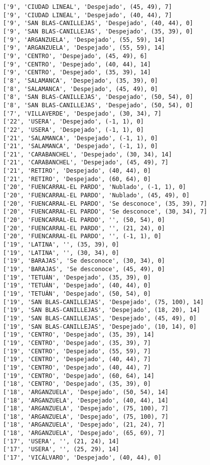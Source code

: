 \documentclass[11pt]{article}
\begin{document}
\begin{Verbatim}[commandchars=\\\{\}]
['9', 'CIUDAD LINEAL', 'Despejado', (45, 49), 7]
['9', 'CIUDAD LINEAL', 'Despejado', (40, 44), 7]
['9', 'SAN BLAS-CANILLEJAS', 'Despejado', (40, 44), 0]
['9', 'SAN BLAS-CANILLEJAS', 'Despejado', (35, 39), 0]
['9', 'ARGANZUELA', 'Despejado', (55, 59), 14]
['9', 'ARGANZUELA', 'Despejado', (55, 59), 14]
['9', 'CENTRO', 'Despejado', (45, 49), 6]
['9', 'CENTRO', 'Despejado', (40, 44), 14]
['9', 'CENTRO', 'Despejado', (35, 39), 14]
['8', 'SALAMANCA', 'Despejado', (35, 39), 0]
['8', 'SALAMANCA', 'Despejado', (45, 49), 0]
['8', 'SAN BLAS-CANILLEJAS', 'Despejado', (50, 54), 0]
['8', 'SAN BLAS-CANILLEJAS', 'Despejado', (50, 54), 0]
['7', 'VILLAVERDE', 'Despejado', (30, 34), 7]
['22', 'USERA', 'Despejado', (-1, 1), 0]
['22', 'USERA', 'Despejado', (-1, 1), 0]
['21', 'SALAMANCA', 'Despejado', (-1, 1), 0]
['21', 'SALAMANCA', 'Despejado', (-1, 1), 0]
['21', 'CARABANCHEL', 'Despejado', (30, 34), 14]
['21', 'CARABANCHEL', 'Despejado', (45, 49), 7]
['21', 'RETIRO', 'Despejado', (40, 44), 0]
['21', 'RETIRO', 'Despejado', (60, 64), 0]
['20', 'FUENCARRAL-EL PARDO', 'Nublado', (-1, 1), 0]
['20', 'FUENCARRAL-EL PARDO', 'Nublado', (45, 49), 0]
['20', 'FUENCARRAL-EL PARDO', 'Se desconoce', (35, 39), 7]
['20', 'FUENCARRAL-EL PARDO', 'Se desconoce', (30, 34), 7]
['20', 'FUENCARRAL-EL PARDO', '', (50, 54), 0]
['20', 'FUENCARRAL-EL PARDO', '', (21, 24), 0]
['20', 'FUENCARRAL-EL PARDO', '', (-1, 1), 0]
['19', 'LATINA', '', (35, 39), 0]
['19', 'LATINA', '', (30, 34), 0]
['19', 'BARAJAS', 'Se desconoce', (30, 34), 0]
['19', 'BARAJAS', 'Se desconoce', (45, 49), 0]
['19', 'TETUÁN', 'Despejado', (35, 39), 0]
['19', 'TETUÁN', 'Despejado', (40, 44), 0]
['19', 'TETUÁN', 'Despejado', (50, 54), 0]
['19', 'SAN BLAS-CANILLEJAS', 'Despejado', (75, 100), 14]
['19', 'SAN BLAS-CANILLEJAS', 'Despejado', (18, 20), 14]
['19', 'SAN BLAS-CANILLEJAS', 'Despejado', (45, 49), 0]
['19', 'SAN BLAS-CANILLEJAS', 'Despejado', (10, 14), 0]
['19', 'CENTRO', 'Despejado', (35, 39), 14]
['19', 'CENTRO', 'Despejado', (35, 39), 7]
['19', 'CENTRO', 'Despejado', (55, 59), 7]
['19', 'CENTRO', 'Despejado', (40, 44), 7]
['19', 'CENTRO', 'Despejado', (40, 44), 7]
['19', 'CENTRO', 'Despejado', (60, 64), 14]
['18', 'CENTRO', 'Despejado', (35, 39), 0]
['18', 'ARGANZUELA', 'Despejado', (50, 54), 14]
['18', 'ARGANZUELA', 'Despejado', (40, 44), 14]
['18', 'ARGANZUELA', 'Despejado', (75, 100), 7]
['18', 'ARGANZUELA', 'Despejado', (75, 100), 7]
['18', 'ARGANZUELA', 'Despejado', (21, 24), 7]
['18', 'ARGANZUELA', 'Despejado', (65, 69), 7]
['17', 'USERA', '', (21, 24), 14]
['17', 'USERA', '', (25, 29), 14]
['17', 'VICÁLVARO', 'Despejado', (40, 44), 0]

\end{Verbatim}
\end{document}
